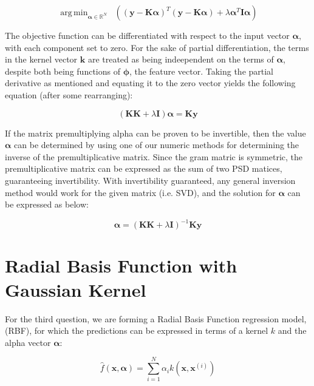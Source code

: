 \documentclass{article}
\DeclareMathOperator*{\argmin}{arg\,min}
\begin{document}
\begin{equation}
\argmin_{\boldsymbol\alpha \in \mathbb{R}^N} \;\; ( (\mathbf{y} - \mathbf{K}\boldsymbol\alpha)^T (\mathbf{y} - \mathbf{K}\boldsymbol\alpha) + \lambda \boldsymbol\alpha^T \mathbf{I} \boldsymbol\alpha)
\end{equation}

The objective function can be differentiated with respect to the input vector $\boldsymbol\alpha$, with each component set to zero. For the sake of partial differentiation, the terms in the kernel vector $\mathbf{k}$ are treated as being indeependent on the terms of $\boldsymbol\alpha$, despite both being functions of $\boldsymbol\phi$, the feature vector. Taking the partial derivative as mentioned and equating it to the zero vector yields the following equation (after some rearranging):

\begin{equation}
(\mathbf{K} \mathbf{K} + \lambda \mathbf{I}) \boldsymbol\alpha = \mathbf{Ky}
\end{equation}

If the matrix premultiplying alpha can be proven to be invertible, then the value $\boldsymbol\alpha$ can be determined by using one of our numeric methods for determining the inverse of the premultiplicative matrix. Since the gram matric is symmetric, the premultiplicative matrix can be expressed as the sum of two PSD matices, guaranteeing invertibility. With invertibility guaranteed, any general inversion method would work for the given matrix (i.e. SVD), and the solution for $\boldsymbol\alpha$ can be expressed as below:

\begin{equation}
\boldsymbol\alpha = (\mathbf{KK} + \lambda \mathbf{I})^{-1}\mathbf{Ky}
\end{equation}

\iftrue
\section{Radial Basis Function with Gaussian Kernel}
For the third question, we are forming a Radial Basis Function regression model, (RBF), for which the predictions can be expressed in terms of a kernel $k$ and the alpha vector $\boldsymbol\alpha$:

\begin{equation}
\hat{f}(\mathbf{x}, \boldsymbol\alpha) = \sum_{i=1}^{N} \alpha_i k(\mathbf{x}, \mathbf{x}^{(i)})
\end{equation}
\end{document}
